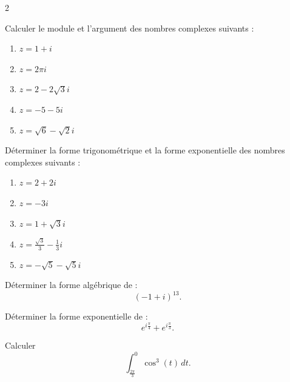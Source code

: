 \documentclass[a4paper,12pt]{article}
\title{
\centering
\tcbset{colframe=BlackSav,colback=GrayBG}
\tcbox[tikznode]{
Chapitre 3 \\ Nombres complexes - propriétés géométriques
}
}
\author{}
\date{}
\begin{document}
\maketitle

\begin{multicols}{2}

\begin{exercice}[title=Exercice 1 \quad$\star$\quad\ {[}Calculer{]}]{}{}
Calculer le module et l’argument des nombres complexes suivants :
\begin{enumerate}
    \item \( z = 1 + i \)
    \item \( z = 2\pi i \)
    \item \( z = 2 - 2\sqrt{3}i \)
    \item \( z = -5 - 5i \)
    \item \( z = \sqrt{6} - \sqrt{2}i \)
\end{enumerate}
\end{exercice}

\begin{exercice}[title=Exercice 2 \quad$\star$\quad\ {[}Calculer{]}]{}{}
Déterminer la forme trigonométrique et la forme exponentielle des nombres complexes suivants :
\begin{enumerate}
    \item \( z = 2 + 2i \)
    \item \( z = -3i \)
    \item \( z = 1 + \sqrt{3}i \)
    \item \( z = \frac{\sqrt{3}}{3} - \frac{1}{3}i \)
    \item \( z = -\sqrt{5} - \sqrt{5}i \)
\end{enumerate}
\end{exercice}

\begin{exercice}[title=Exercice 3 \quad$\star$\quad\ {[}Calculer{]}]{}{}
Déterminer la forme algébrique de :
\[
(-1 + i)^{13}.
\]
\end{exercice}

\begin{exercice}[title=Exercice 4 \quad$\star\star$\quad\ {[}Calculer{]}]{}{}
Déterminer la forme exponentielle de :
\[
e^{i\frac{\pi}{4}} + e^{i\frac{\pi}{3}}.
\]
\end{exercice}

\begin{exercice}[title=Exercice 5 \quad$\star\star$\quad\ {[}Calculer{]}]{}{}
Calculer
\[
\int_{\frac{2\pi}{3}}^{0} \cos^3(t) \, dt.
\]
\end{exercice}


\end{multicols}
\end{document}
